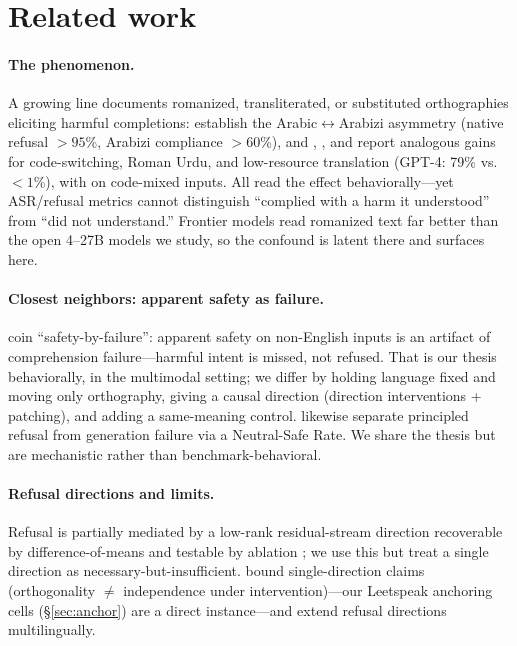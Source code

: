 \documentclass[11pt]{article}
\begin{document}
\section{Related work}

\paragraph{The phenomenon.} A growing line documents romanized, transliterated, or substituted orthographies eliciting harmful completions: \citet{alghanim2024} establish the Arabic$\leftrightarrow$Arabizi asymmetry (native refusal ${>}95$\%, Arabizi compliance ${>}60$\%), and \citet{yoo2025}, \citet{jamil2026}, and \citet{yong2023} report analogous gains for code-switching, Roman Urdu, and low-resource translation (GPT-4: 79\% vs.\ ${<}1$\%), with \citet{banerjee2025} on code-mixed inputs. All read the effect behaviorally---yet ASR/refusal metrics cannot distinguish ``complied with a harm it understood'' from ``did not understand.'' Frontier models read romanized text far better than the open 4--27B models we study, so the confound is latent there and surfaces here.

\paragraph{Closest neighbors: apparent safety as failure.} \citet{malik2026} coin ``safety-by-failure'': apparent safety on non-English inputs is an artifact of comprehension failure---harmful intent is missed, not refused. That is our thesis behaviorally, in the multimodal setting; we differ by holding language fixed and moving only orthography, giving a causal direction (direction interventions + patching), and adding a same-meaning control. \citet{choi2026} likewise separate principled refusal from generation failure via a Neutral-Safe Rate. We share the thesis but are mechanistic rather than benchmark-behavioral.

\paragraph{Refusal directions and limits.} Refusal is partially mediated by a low-rank residual-stream direction recoverable by difference-of-means and testable by ablation \citep{arditi2024}; we use this but treat a single direction as necessary-but-insufficient. \citet{wollschlager2025} bound single-direction claims (orthogonality $\neq$ independence under intervention)---our Leetspeak anchoring cells (\S\ref{sec:anchor}) are a direct instance---and \citet{wang2025} extend refusal directions multilingually.
\end{document}
